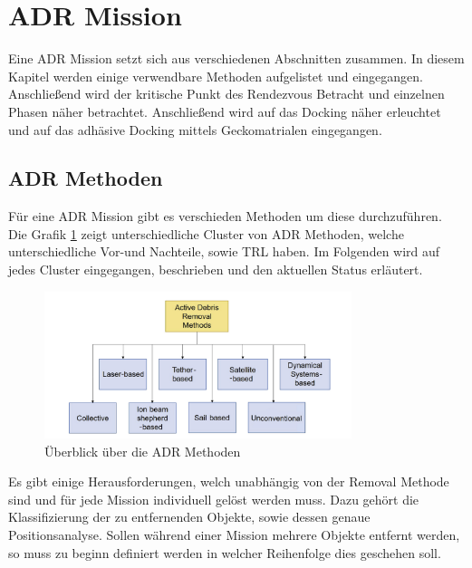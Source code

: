 	\section{ADR Mission}

	Eine ADR Mission setzt sich aus verschiedenen Abschnitten zusammen. In diesem Kapitel werden einige verwendbare Methoden aufgelistet und eingegangen. Anschließend wird der kritische Punkt des Rendezvous Betracht und einzelnen Phasen näher betrachtet. Anschließend wird auf das Docking näher erleuchtet und auf das adhäsive Docking mittels Geckomatrialen  eingegangen. 
\subsection{ADR Methoden}
	
	Für eine ADR Mission gibt es verschieden Methoden um diese durchzuführen. Die Grafik \ref{fig:ADR_Methoden} zeigt unterschiedliche Cluster von ADR Methoden, welche unterschiedliche Vor-und Nachteile, sowie TRL haben. Im Folgenden wird auf jedes Cluster eingegangen, beschrieben und den aktuellen Status erläutert.
	
				\begin{figure}[h]
				\centering
					\includegraphics[width=0.80\textwidth]{./graphics/ADR/ADR_methods.PNG}
				\caption{Überblick über die ADR Methoden \cite{Mark.2019}}
				\label{fig:ADR_Methoden} 
			\end{figure}
			
	
Es gibt einige Herausforderungen, welch unabhängig von der Removal Methode sind und für jede Mission individuell gelöst werden muss. Dazu gehört die Klassifizierung der zu entfernenden Objekte, sowie dessen genaue Positionsanalyse. Sollen während einer Mission mehrere Objekte entfernt werden, so muss zu beginn definiert werden in welcher Reihenfolge dies geschehen soll. 

